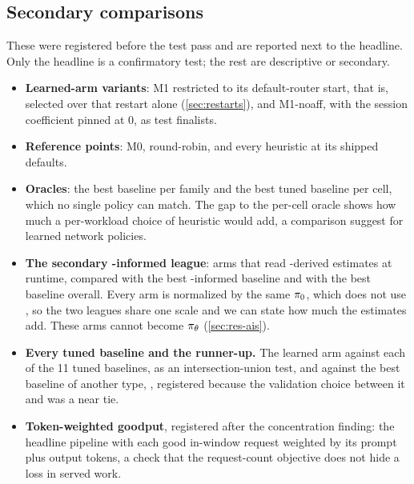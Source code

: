 \subsection{Secondary comparisons}
\label{sec:secondary}

These were registered before the test pass and are reported next to the headline. Only the
headline is a confirmatory test; the rest are descriptive or secondary.
\begin{itemize}
  \item \textbf{Learned-arm variants}: M1 restricted to its default-router start, that is, selected
    over that restart alone (\cref{sec:restarts}), and M1-noaff, with the session coefficient pinned
    at 0, as test finalists.
  \item \textbf{Reference points}: M0, round-robin, and every heuristic at its shipped defaults.
  \item \textbf{Oracles}: the best baseline per family and the best tuned baseline per cell, which no
    single policy can match. The gap to the per-cell oracle shows how much a per-workload choice of
    heuristic would add, a comparison \citet{xia2022genet} suggest for learned network policies.
  \item \textbf{The secondary \ais{}-informed league}: arms that read \ais{}-derived estimates at
    runtime, compared with the best \ais{}-informed baseline and with the best baseline overall.
    Every arm is normalized by the same $\pi_{0}$, which does not use \ais{}, so the two leagues share
    one scale and we can state how much the \ais{} estimates add. These arms cannot become
    $\pi_{\theta}$ (\cref{sec:res-ais}).
  \item \textbf{Every tuned baseline and the runner-up.} The learned arm against each of the 11
    tuned baselines, as an intersection-union test, and against the best baseline of another type,
    , registered because the validation choice between it and
     was a near tie.
  \item \textbf{Token-weighted goodput}, registered after the concentration finding: the headline
    pipeline with each good in-window request weighted by its prompt plus output tokens, a check that
    the request-count objective does not hide a loss in served work.
\end{itemize}

